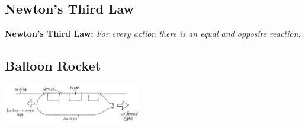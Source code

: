 \begin{multicols}{2}
%
%


\section*{Newton's Third Law}
\textbf{Newton's Third Law: }\emph{For every action there is an equal and opposite reaction.}

\subsection{Balloon Rocket}

\begin{center}
\includegraphics[width=0.45\textwidth]{./img/vso/balloon-rocket.png}
\end{center}


\end{multicols}
